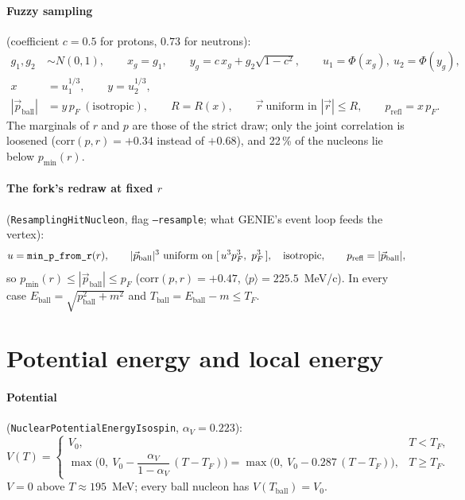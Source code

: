 \documentclass[11pt]{article}
\newcommand{\vv}[1]{\vec{#1}}
\newcommand{\ball}{\mathrm{ball}}
\newcommand{\refl}{\mathrm{refl}}
\newcommand{\pF}{p_F}
\newcommand{\TF}{T_F}
\newcommand{\Vz}{V_0}
\newcommand{\code}[1]{\texttt{#1}}
\newcommand{\codem}[1]{\text{\texttt{#1}}}
\begin{document}
\paragraph{Fuzzy sampling} (coefficient $c=0.5$ for protons, $0.73$ for neutrons):
\begin{align*}
g_1,g_2&\sim N(0,1),\qquad x_g=g_1,\qquad y_g=c\,x_g+g_2\sqrt{1-c^2},\qquad
u_1=\Phi(x_g),\ u_2=\Phi(y_g),\\
x&=u_1^{1/3},\qquad y=u_2^{1/3},\\
|\vv p_\ball|&=y\,\pF\ (\text{isotropic}),\qquad R=R(x),\qquad
\vv r\ \text{uniform in }|\vv r|\le R,\qquad p_\refl=x\,\pF.
\end{align*}
The marginals of $r$ and $p$ are those of the strict draw; only the joint correlation
is loosened ($\mathrm{corr}(p,r)=+0.34$ instead of $+0.68$), and 22\,\% of the
nucleons lie below $p_{\min}(r)$.

\paragraph{The fork's redraw at fixed $r$} (\code{ResamplingHitNucleon}, flag
\code{--resample}; what GENIE's event loop feeds the vertex):
\begin{equation*}
u=\codem{min\_p\_from\_r}(r),\qquad
|\vv p_\ball|^3\ \text{uniform on }[\,u^3\pF^3,\ \pF^3\,],\quad\text{isotropic},\qquad
p_\refl=|\vv p_\ball|,
\end{equation*}
so $p_{\min}(r)\le|\vv p_\ball|\le\pF$ ($\mathrm{corr}(p,r)=+0.47$,
$\langle p\rangle=225.5$~MeV/c). In every case $E_\ball=\sqrt{p_\ball^2+m^2}$ and
$T_\ball=E_\ball-m\le\TF$.

\section{Potential energy and local energy}\label{sec:pot}

\paragraph{Potential} (\code{NuclearPotentialEnergyIsospin}, $\alpha_V=0.223$):
\begin{equation*}
V(T)=\begin{cases}
\Vz, & T<\TF,\\[4pt]
\max\!\Big(0,\ \Vz-\dfrac{\alpha_V}{1-\alpha_V}\,(T-\TF)\Big)
=\max\big(0,\ \Vz-0.287\,(T-\TF)\big), & T\ge\TF.
\end{cases}
\end{equation*}
$V=0$ above $T\approx195$~MeV; every ball nucleon has $V(T_\ball)=\Vz$.
\end{document}
